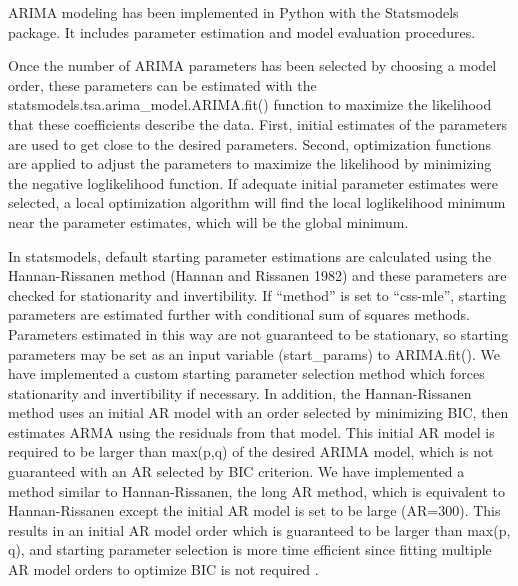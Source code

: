 \documentclass[letterpaper,compsoc,twoside]{IEEEtran}
\begin{document}
ARIMA modeling has been implemented in Python with the Statsmodels package. It includes parameter estimation and model evaluation procedures.

Once the number of ARIMA parameters has been selected by choosing a model order, these parameters can be estimated with the statsmodels.tsa.arima\_model.ARIMA.fit() function to maximize the likelihood that these coefficients describe the data. First, initial estimates of the parameters are used to get close to the desired parameters. Second, optimization functions are applied to adjust the parameters to maximize the likelihood by minimizing the negative loglikelihood function. If adequate initial parameter estimates were selected, a local optimization algorithm will find the local loglikelihood minimum near the parameter estimates, which will be the global minimum.

In statsmodels, default starting parameter estimations are calculated using the Hannan-Rissanen method (Hannan and Rissanen 1982) and these parameters are checked for stationarity and invertibility. If “method” is set to “css-mle”, starting parameters are estimated further with conditional sum of squares methods. Parameters estimated in this way are not guaranteed to be stationary, so starting parameters may be set as an input variable (start\_params) to ARIMA.fit(). We have implemented a custom starting parameter selection method which forces stationarity and invertibility if necessary. In addition, the Hannan-Rissanen method uses an initial AR model with an order selected by minimizing BIC, then estimates ARMA using the residuals from that model. This initial AR model is required to be larger than max(p,q) of the desired ARIMA model, which is not guaranteed with an AR selected by BIC criterion. We have implemented a method similar to Hannan-Rissanen, the long AR method, which is equivalent to Hannan-Rissanen except the initial AR model is set to be large (AR=300). This results in an initial AR model order which is guaranteed to be larger than max(p, q), and starting parameter selection is more time efficient since fitting multiple AR model orders to optimize BIC is not required .
\end{document}
